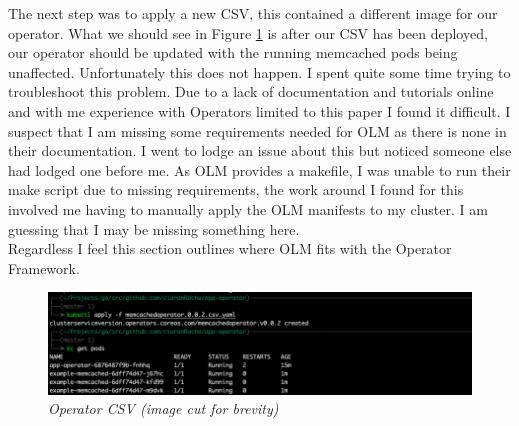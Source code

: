 \newpage The next step was to apply a new CSV, this contained a different image for our operator. What we should see in Figure \ref{img:olm6} is after our CSV has been deployed, our operator should be updated with the running memcached pods being unaffected. Unfortunately this does not happen. I spent quite some time trying to troubleshoot this problem. Due to a lack of documentation and tutorials online and with me experience with Operators limited to this paper I found it difficult. I suspect that I am missing some requirements needed for OLM as there is none in their documentation. I went to lodge an issue about this but noticed someone else had lodged one before me. As OLM provides a makefile, I was unable to run their make script due to missing requirements, the work around I found for this involved me having to manually apply the OLM manifests to my cluster. I am guessing that I may be missing something here. 
\\ Regardless I feel this section outlines where OLM fits with the Operator Framework.
\begin{figure}[!ht]
\centering
\includegraphics*[width=1\textwidth]{images/olm6.png}
\caption{\em Operator CSV (image cut for brevity)}
\label{img:olm6}
\end{figure}